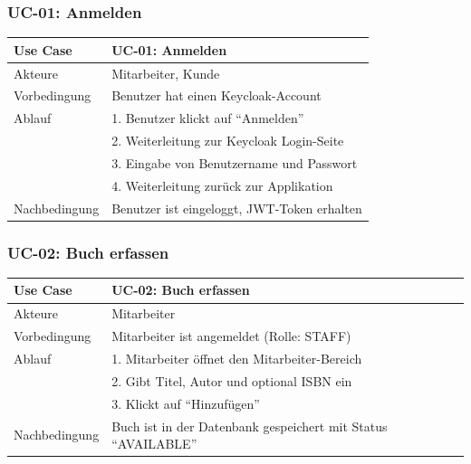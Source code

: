 \documentclass[a4paper,12pt,twoside]{report}
\begin{document}
\subsubsection{UC-01: Anmelden}
\begin{table}[H]
\begin{tabularx}{\textwidth}{l X}
\toprule
\textbf{Use Case} & UC-01: Anmelden \\
\midrule
Akteure & Mitarbeiter, Kunde \\
Vorbedingung & Benutzer hat einen Keycloak-Account \\
Ablauf & 1. Benutzer klickt auf ``Anmelden''\\
& 2. Weiterleitung zur Keycloak Login-Seite\\
& 3. Eingabe von Benutzername und Passwort\\
& 4. Weiterleitung zurück zur Applikation \\
Nachbedingung & Benutzer ist eingeloggt, JWT-Token erhalten \\
\bottomrule
\end{tabularx}
\end{table}

\subsubsection{UC-02: Buch erfassen}
\begin{table}[H]
\begin{tabularx}{\textwidth}{l X}
\toprule
\textbf{Use Case} & UC-02: Buch erfassen \\
\midrule
Akteure & Mitarbeiter \\
Vorbedingung & Mitarbeiter ist angemeldet (Rolle: STAFF) \\
Ablauf & 1. Mitarbeiter öffnet den Mitarbeiter-Bereich\\
& 2. Gibt Titel, Autor und optional ISBN ein\\
& 3. Klickt auf ``Hinzufügen'' \\
Nachbedingung & Buch ist in der Datenbank gespeichert mit Status ``AVAILABLE'' \\
\bottomrule
\end{tabularx}
\end{table}
\end{document}

